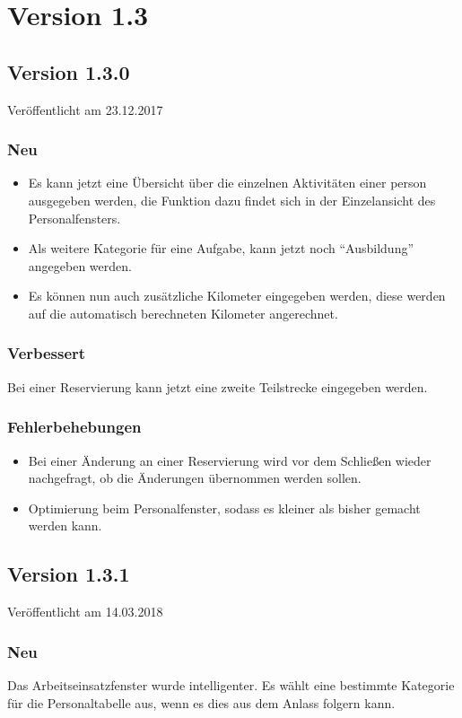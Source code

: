 \section{Version 1.3}\label{versionshistorie:1:3}
\subsection{Version 1.3.0}
\label{version:1:3:0}
Veröffentlicht am 23.12.2017
\subsubsection{Neu}
\begin{itemize}
  \item
  Es kann jetzt eine Übersicht über die einzelnen Aktivitäten einer person ausgegeben werden, die Funktion dazu findet sich in der Einzelansicht des Personalfensters.
  \item
  Als weitere Kategorie für eine Aufgabe, kann jetzt noch "`Ausbildung"' angegeben werden.
  \item
  Es können nun auch zusätzliche Kilometer eingegeben werden, diese werden auf die automatisch berechneten Kilometer angerechnet.
\end{itemize}

\subsubsection{Verbessert}
Bei einer Reservierung kann jetzt eine zweite Teilstrecke eingegeben werden.

\subsubsection{Fehlerbehebungen}
\begin{itemize}
  \item
  Bei einer Änderung an einer Reservierung wird vor dem Schließen wieder nachgefragt, ob die Änderungen übernommen werden sollen.
  \item
  Optimierung beim Personalfenster, sodass es kleiner als bisher gemacht werden kann.
\end{itemize}


\subsection{Version 1.3.1}
\label{version:1:3:1}
Veröffentlicht am 14.03.2018
\subsubsection{Neu}
Das Arbeitseinsatzfenster wurde intelligenter. Es wählt eine bestimmte Kategorie für die Personaltabelle aus, wenn es dies aus dem Anlass folgern kann.


